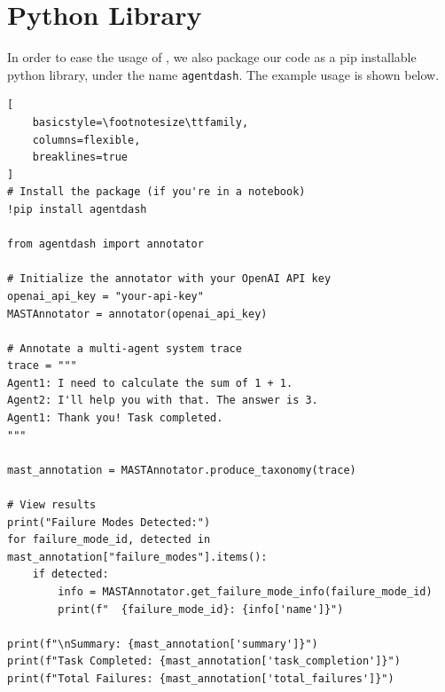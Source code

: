 \section{\taxonomy{} Python Library}
\label{sec:python_library}

In order to ease the usage of \taxonomy{}, we also package our code as a pip installable python library, under the name \verb|agentdash|. The example usage is shown below.

\begin{lstlisting}[
    basicstyle=\footnotesize\ttfamily,
    columns=flexible,
    breaklines=true
]
# Install the package (if you're in a notebook)
!pip install agentdash

from agentdash import annotator

# Initialize the annotator with your OpenAI API key
openai_api_key = "your-api-key"
MASTAnnotator = annotator(openai_api_key)

# Annotate a multi-agent system trace
trace = """
Agent1: I need to calculate the sum of 1 + 1.
Agent2: I'll help you with that. The answer is 3.
Agent1: Thank you! Task completed.
"""

mast_annotation = MASTAnnotator.produce_taxonomy(trace)

# View results
print("Failure Modes Detected:")
for failure_mode_id, detected in mast_annotation["failure_modes"].items():
    if detected:
        info = MASTAnnotator.get_failure_mode_info(failure_mode_id)
        print(f"  {failure_mode_id}: {info['name']}")

print(f"\nSummary: {mast_annotation['summary']}")
print(f"Task Completed: {mast_annotation['task_completion']}")
print(f"Total Failures: {mast_annotation['total_failures']}")

\end{lstlisting}